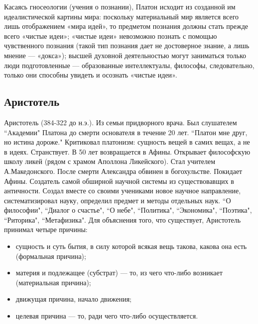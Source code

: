 \documentclass[12pt]{article}
\begin{document}
Касаясь гносеологии (учения о познании), Платон исходит из созданной им идеалистической картины мира:
поскольку материальный мир является всего лишь отображением «мира идей», то предметом познания должны
стать прежде всего «чистые идеи»; «чистые идеи» невозможно познать с помощью чувственного познания
(такой тип познания дает не достоверное знание, а лишь мнение --- «докса»); высшей духовной деятельностью
могут  заниматься  только люди подготовленные --- образованные  интеллектуалы,  философы,  следовательно,
только они способны увидеть и осознать «чистые идеи».

\subsection{Аристотель}
Аристотель (384-322 до н.э.).
Из семьи придворного врача. Был слушателем ``Aкадемии" Платона до смерти основателя
в течение 20 лет. ``Платон мне друг, но истина дороже."
Критиковал платонизм: сущность вещей в самих вещах, а не
в идеях. Странствует. В 50 лет возвращается в Афины.
Открывает философскую школу ликей (рядом с храмом Аполлона
Ликейского). Стал учителем А.Македонского. После смерти Александра обвинен в богохульстве. Покидает Афины.
Создатель самой обширной научной системы из существовавщих в античности.
Создал вместе со своими учениками новое
научное направление, систематизировал науку, определил предмет и методы отдельных наук.
``О философии", ``Диалог о
счастье", ``О небе", ``Политика", ``Экономика", ``Поэтика", ``Риторика", ``Метафизика". 
Для объяснения того, что существует, Аристотель принимал четыре причины:
\begin{itemize}
  \item сущность и суть бытия, в силу которой всякая вещь такова, какова она есть (формальная причина);
  \item материя и подлежащее (субстрат) --- то, из чего что-либо возникает (материальная причина);
  \item движущая причина, начало движения;
  \item  целевая причина --- то, ради чего что-либо осуществляется.
\end{itemize}
\end{document}

